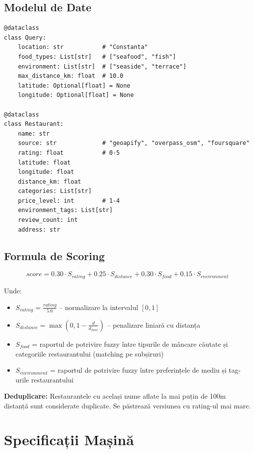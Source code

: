 \documentclass[12pt,a4paper]{article}
\begin{document}
\subsection{Modelul de Date}

\begin{lstlisting}[caption={Clasele principale de date}]
@dataclass
class Query:
    location: str           # "Constanta"
    food_types: List[str]   # ["seafood", "fish"]
    environment: List[str]  # ["seaside", "terrace"]
    max_distance_km: float  # 10.0
    latitude: Optional[float] = None
    longitude: Optional[float] = None

@dataclass
class Restaurant:
    name: str
    source: str             # "geoapify", "overpass_osm", "foursquare"
    rating: float           # 0-5
    latitude: float
    longitude: float
    distance_km: float
    categories: List[str]
    price_level: int        # 1-4
    environment_tags: List[str]
    review_count: int
    address: str
\end{lstlisting}

\subsection{Formula de Scoring}

$$score = 0.30 \cdot S_{rating} + 0.25 \cdot S_{distance} + 0.30 \cdot S_{food} + 0.15 \cdot S_{environment}$$

Unde:
\begin{itemize}
    \item $S_{rating} = \frac{rating}{5.0}$ -- normalizare la intervalul $[0, 1]$
    \item $S_{distance} = \max(0, 1 - \frac{d}{d_{max}})$ -- penalizare liniară cu distanța
    \item $S_{food}$ = raportul de potrivire fuzzy între tipurile de mâncare căutate și categoriile restaurantului (matching pe subșiruri)
    \item $S_{environment}$ = raportul de potrivire fuzzy între preferințele de mediu și tag-urile restaurantului
\end{itemize}

\textbf{Deduplicare:} Restaurantele cu același nume aflate la mai puțin de 100m distanță sunt considerate duplicate. Se păstrează versiunea cu rating-ul mai mare.

\section{Specificații Mașină}
\end{document}
